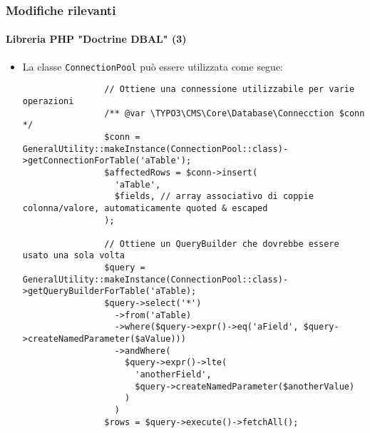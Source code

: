 \begin{frame}[fragile]
	\frametitle{Modifiche rilevanti}
	\framesubtitle{Libreria PHP "Doctrine DBAL" (3)}

	\lstset{basicstyle=\tiny\ttfamily}

	\begin{itemize}

		\item La classe \texttt{ConnectionPool} può essere utilizzata come segue:
			\begin{lstlisting}
				// Ottiene una connessione utilizzabile per varie operazioni
				/** @var \TYPO3\CMS\Core\Database\Connecction $conn */
				$conn = GeneralUtility::makeInstance(ConnectionPool::class)->getConnectionForTable('aTable');
				$affectedRows = $conn->insert(
				  'aTable',
				  $fields, // array associativo di coppie colonna/valore, automaticamente quoted & escaped
				);

				// Ottiene un QueryBuilder che dovrebbe essere usato una sola volta
				$query = GeneralUtility::makeInstance(ConnectionPool::class)->getQueryBuilderForTable('aTable);
				$query->select('*')
				  ->from('aTable)
				  ->where($query->expr()->eq('aField', $query->createNamedParameter($aValue)))
				  ->andWhere(
					$query->expr()->lte(
					  'anotherField',
					  $query->createNamedParameter($anotherValue)
					)
				  )
				$rows = $query->execute()->fetchAll();
			\end{lstlisting}
	\end{itemize}

\end{frame}

